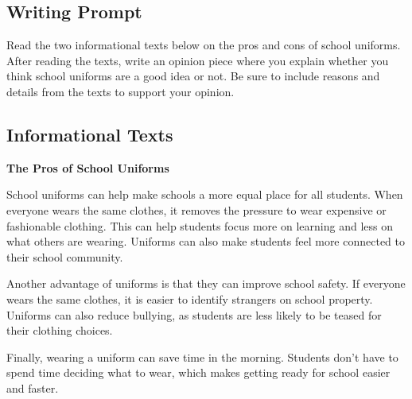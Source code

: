 \documentclass[12pt]{article}
\begin{document}
\onehalfspacing

\subsection*{Writing Prompt}

\noindent Read the two informational texts below on the pros and cons of school uniforms. After reading the texts, write an opinion piece where you explain whether you think school uniforms are a good idea or not. Be sure to include reasons and details from the texts to support your opinion.

\vspace{0.5cm}

\subsection*{Informational Texts}

\begin{tcolorbox}[colframe=black!40, colback=gray!5]

\textbf{The Pros of School Uniforms}

School uniforms can help make schools a more equal place for all students. When everyone wears the same clothes, it removes the pressure to wear expensive or fashionable clothing. This can help students focus more on learning and less on what others are wearing. Uniforms can also make students feel more connected to their school community.

Another advantage of uniforms is that they can improve school safety. If everyone wears the same clothes, it is easier to identify strangers on school property. Uniforms can also reduce bullying, as students are less likely to be teased for their clothing choices.

Finally, wearing a uniform can save time in the morning. Students don’t have to spend time deciding what to wear, which makes getting ready for school easier and faster.

\end{tcolorbox}

\vspace{0.5cm}
\end{document}
